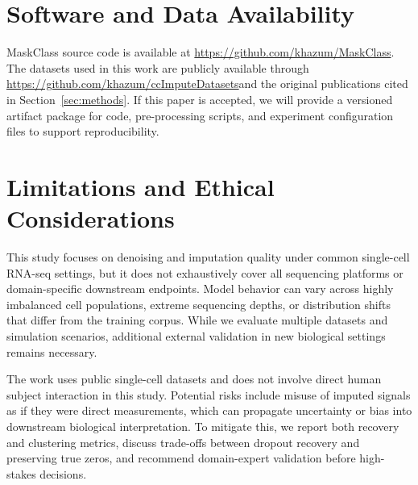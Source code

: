 \documentclass[sigconf,review]{acmart}
\theoremstyle{plain}
\theoremstyle{definition}
\theoremstyle{remark}
\newcommand{\maskclassrepolink}{%
  \url{https://github.com/khazum/MaskClass}}
\newcommand{\ccimputedatasetslink}{%
  \url{https://github.com/khazum/ccImputeDatasets}}
\begin{document}
\section{Software and Data Availability}
MaskClass source code is available at \maskclassrepolink.
The datasets used in this work are publicly available through
\ccimputedatasetslink and the original publications cited in
Section~\ref{sec:methods}.
If this paper is accepted, we will provide a versioned artifact package for
code, pre-processing scripts, and experiment configuration files to support
reproducibility.




\section{Limitations and Ethical Considerations}
This study focuses on denoising and imputation quality under common
single-cell RNA-seq settings, but it does not exhaustively cover all sequencing
platforms or domain-specific downstream endpoints. Model behavior can vary
across highly imbalanced cell populations, extreme sequencing depths, or
distribution shifts that differ from the training corpus. While we evaluate
multiple datasets and simulation scenarios, additional external validation in
new biological settings remains necessary.

The work uses public single-cell datasets and does not involve direct human
subject interaction in this study. Potential risks include misuse of imputed
signals as if they were direct measurements, which can propagate uncertainty or
bias into downstream biological interpretation. To mitigate this, we report
both recovery and clustering metrics, discuss trade-offs between dropout
recovery and preserving true zeros, and recommend domain-expert validation
before high-stakes decisions.



\end{document}
